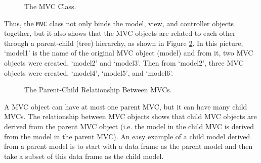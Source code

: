 \documentclass{article}[11pt]
\newcommand{\Robject}[1]{{\texttt{#1}}}
\begin{document}
\begin{figure}[ht]
  \begin{center}
    \caption{ The MVC Class. }
    \label{Fig:MVCClass}
  \end{center}
\end{figure}

Thus, the \Robject{MVC} class not only binds the model, view, and controller
objects together, but it also shows that the MVC objects are related
to each other through a parent-child (tree) hierarchy, as shown in Figure
\ref{Fig:Hier}.  In this picture, `model1' is the name of the original MVC
object (model) and from it, two MVC objects were created, `model2' and
`model3'. Then from `model2', three MVC objects were created, `model4',
`model5', and `model6'.  

\clearpage

\begin{figure}[ht]
  \begin{center}
    \caption{ The Parent-Child Relationship Between MVCs. }
    \label{Fig:Hier}
  \end{center}
\end{figure}

A MVC object can have at most one parent MVC, but it can have many child
MVCs.  The relationship between MVC objects shows that child MVC objects are
derived from the parent MVC object (i.e. the model in the child MVC is derived
from the model in the parent MVC).  An easy example of a child model derived
from a parent model is to start with a data frame as the parent model and then
take a subset of this data frame as the child model. 
\end{document}
